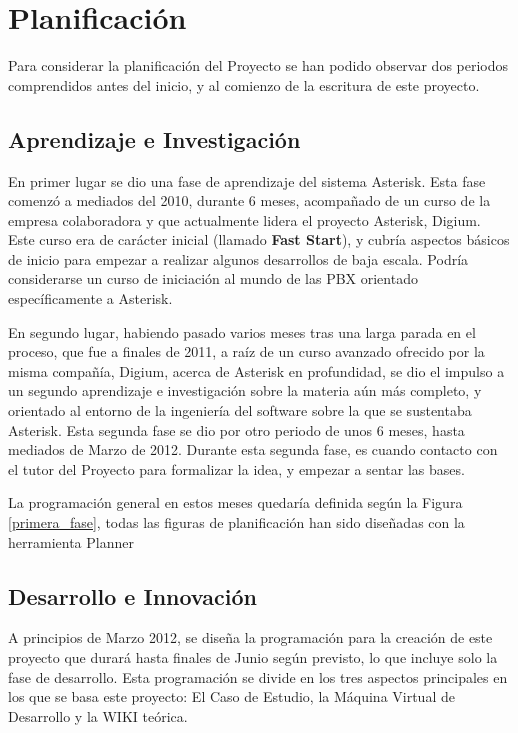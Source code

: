 \section{Planificación}

Para considerar la planificación del Proyecto se han podido observar dos periodos comprendidos antes del inicio, y al comienzo de la escritura de este proyecto.

\subsection{Aprendizaje e Investigación}

En primer lugar se dio una fase de aprendizaje del sistema Asterisk. Esta fase comenzó a mediados del 2010, durante 6 meses, acompañado de un curso de la empresa colaboradora y que actualmente lidera el proyecto Asterisk, Digium. Este curso era de carácter inicial (llamado \textbf{Fast Start}), y cubría aspectos básicos de inicio para empezar a realizar algunos desarrollos de baja escala. Podría considerarse un curso de iniciación al mundo de las PBX orientado específicamente a Asterisk. 

En segundo lugar, habiendo pasado varios meses tras una larga parada en el proceso, que fue a finales de 2011, a raíz de un curso avanzado ofrecido por la misma compañía, Digium, acerca de Asterisk en profundidad, se dio el impulso a un segundo aprendizaje e investigación sobre la materia aún más completo, y orientado al entorno de la ingeniería del software sobre la que se sustentaba Asterisk. Esta segunda fase se dio por otro periodo de unos 6 meses, hasta mediados de Marzo de 2012. Durante esta segunda fase, es cuando contacto con el tutor del Proyecto para formalizar la idea, y empezar a sentar las bases.

La programación general en estos meses quedaría definida según la Figura \ref{primera_fase}, todas las figuras de planificación han sido diseñadas con la herramienta Planner \cite{website:planner}


\subsection{Desarrollo e Innovación}

A principios de Marzo 2012, se diseña la programación para la creación de este proyecto que durará hasta finales de Junio según previsto, lo que incluye solo la fase de desarrollo. Esta programación se divide en los tres aspectos principales en los que se basa este proyecto: El Caso de Estudio, la Máquina Virtual de Desarrollo y la WIKI teórica.

